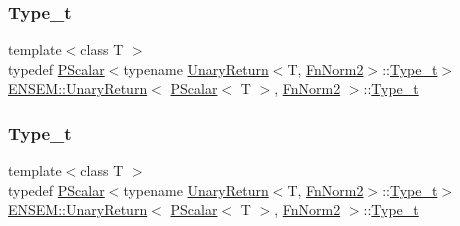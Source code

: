 \subsubsection{\texorpdfstring{Type\_t}{Type\_t}\hspace{0.1cm}{\footnotesize\ttfamily [1/3]}}
{\footnotesize\ttfamily template$<$class T $>$ \\
typedef \mbox{\hyperlink{classENSEM_1_1PScalar}{P\+Scalar}}$<$typename \mbox{\hyperlink{structENSEM_1_1UnaryReturn}{Unary\+Return}}$<$T, \mbox{\hyperlink{structENSEM_1_1FnNorm2}{Fn\+Norm2}}$>$\+::\mbox{\hyperlink{structENSEM_1_1UnaryReturn_3_01PScalar_3_01T_01_4_00_01FnNorm2_01_4_a668c493a2fae41d6416ca55cc046b6b5}{Type\+\_\+t}}$>$ \mbox{\hyperlink{structENSEM_1_1UnaryReturn}{E\+N\+S\+E\+M\+::\+Unary\+Return}}$<$ \mbox{\hyperlink{classENSEM_1_1PScalar}{P\+Scalar}}$<$ T $>$, \mbox{\hyperlink{structENSEM_1_1FnNorm2}{Fn\+Norm2}} $>$\+::\mbox{\hyperlink{structENSEM_1_1UnaryReturn_3_01PScalar_3_01T_01_4_00_01FnNorm2_01_4_a668c493a2fae41d6416ca55cc046b6b5}{Type\+\_\+t}}}

\mbox{\label{structENSEM_1_1UnaryReturn_3_01PScalar_3_01T_01_4_00_01FnNorm2_01_4_a668c493a2fae41d6416ca55cc046b6b5}} 
\subsubsection{\texorpdfstring{Type\_t}{Type\_t}\hspace{0.1cm}{\footnotesize\ttfamily [2/3]}}
{\footnotesize\ttfamily template$<$class T $>$ \\
typedef \mbox{\hyperlink{classENSEM_1_1PScalar}{P\+Scalar}}$<$typename \mbox{\hyperlink{structENSEM_1_1UnaryReturn}{Unary\+Return}}$<$T, \mbox{\hyperlink{structENSEM_1_1FnNorm2}{Fn\+Norm2}}$>$\+::\mbox{\hyperlink{structENSEM_1_1UnaryReturn_3_01PScalar_3_01T_01_4_00_01FnNorm2_01_4_a668c493a2fae41d6416ca55cc046b6b5}{Type\+\_\+t}}$>$ \mbox{\hyperlink{structENSEM_1_1UnaryReturn}{E\+N\+S\+E\+M\+::\+Unary\+Return}}$<$ \mbox{\hyperlink{classENSEM_1_1PScalar}{P\+Scalar}}$<$ T $>$, \mbox{\hyperlink{structENSEM_1_1FnNorm2}{Fn\+Norm2}} $>$\+::\mbox{\hyperlink{structENSEM_1_1UnaryReturn_3_01PScalar_3_01T_01_4_00_01FnNorm2_01_4_a668c493a2fae41d6416ca55cc046b6b5}{Type\+\_\+t}}}

